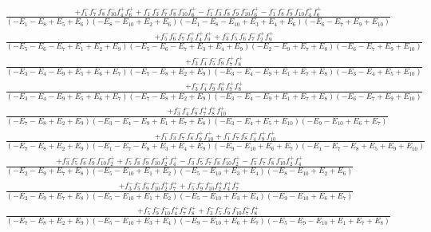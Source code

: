 \documentclass{article}
\begin{document}
\[\begin{array}{rcl}
\frac{+f_{1}^{-}f_{7}^{-}f_{8}^{-}f_{10}^{-}f_{4}^{+}f_{6}^{+}+f_{1}^{-}f_{3}^{-}f_{7}^{-}f_{8}^{-}f_{10}^{-}f_{6}^{+}-f_{1}^{-}f_{3}^{-}f_{8}^{-}f_{9}^{-}f_{10}^{-}f_{6}^{+}-f_{1}^{-}f_{8}^{-}f_{9}^{-}f_{10}^{-}f_{4}^{+}f_{6}^{+}}{(-E_{1}-E_{8}+E_{5}+E_{6})(-E_{8}-E_{10}+E_{2}+E_{6})(-E_{1}-E_{8}-E_{10}+E_{3}+E_{4}+E_{6})(-E_{6}-E_{7}+E_{9}+E_{10})}\\
\frac{+f_{5}^{-}f_{6}^{-}f_{7}^{-}f_{2}^{+}f_{4}^{+}f_{9}^{+}+f_{3}^{-}f_{5}^{-}f_{6}^{-}f_{7}^{-}f_{2}^{+}f_{9}^{+}}{(-E_{5}-E_{6}-E_{7}+E_{1}+E_{2}+E_{9})(-E_{5}-E_{6}-E_{7}+E_{3}+E_{4}+E_{9})(-E_{2}-E_{9}+E_{7}+E_{8})(-E_{6}-E_{7}+E_{9}+E_{10})}\\
\frac{+f_{3}^{-}f_{4}^{-}f_{5}^{-}f_{9}^{-}f_{7}^{+}f_{8}^{+}}{(-E_{3}-E_{4}-E_{9}+E_{5}+E_{6}+E_{7})(-E_{7}-E_{8}+E_{2}+E_{9})(-E_{3}-E_{4}-E_{9}+E_{1}+E_{7}+E_{8})(-E_{3}-E_{4}+E_{5}+E_{10})}\\
\frac{+f_{3}^{-}f_{4}^{-}f_{9}^{-}f_{6}^{+}f_{7}^{+}f_{8}^{+}}{(-E_{3}-E_{4}-E_{9}+E_{5}+E_{6}+E_{7})(-E_{7}-E_{8}+E_{2}+E_{9})(-E_{3}-E_{4}-E_{9}+E_{1}+E_{7}+E_{8})(-E_{6}-E_{7}+E_{9}+E_{10})}\\
\frac{+f_{3}^{-}f_{4}^{-}f_{9}^{-}f_{7}^{+}f_{8}^{+}f_{10}^{+}}{(-E_{7}-E_{8}+E_{2}+E_{9})(-E_{3}-E_{4}-E_{9}+E_{1}+E_{7}+E_{8})(-E_{3}-E_{4}+E_{5}+E_{10})(-E_{9}-E_{10}+E_{6}+E_{7})}\\
\frac{+f_{1}^{-}f_{3}^{-}f_{7}^{-}f_{8}^{-}f_{9}^{+}f_{10}^{+}+f_{1}^{-}f_{7}^{-}f_{8}^{-}f_{4}^{+}f_{9}^{+}f_{10}^{+}}{(-E_{7}-E_{8}+E_{2}+E_{9})(-E_{1}-E_{7}-E_{8}+E_{3}+E_{4}+E_{9})(-E_{9}-E_{10}+E_{6}+E_{7})(-E_{1}-E_{7}-E_{8}+E_{5}+E_{9}+E_{10})}\\
\frac{+f_{3}^{-}f_{5}^{-}f_{8}^{-}f_{9}^{-}f_{10}^{-}f_{2}^{+}+f_{5}^{-}f_{8}^{-}f_{9}^{-}f_{10}^{-}f_{2}^{+}f_{4}^{+}-f_{3}^{-}f_{5}^{-}f_{7}^{-}f_{8}^{-}f_{10}^{-}f_{2}^{+}-f_{5}^{-}f_{7}^{-}f_{8}^{-}f_{10}^{-}f_{2}^{+}f_{4}^{+}}{(-E_{2}-E_{9}+E_{7}+E_{8})(-E_{5}-E_{10}+E_{1}+E_{2})(-E_{5}-E_{10}+E_{3}+E_{4})(-E_{8}-E_{10}+E_{2}+E_{6})}\\
\frac{+f_{3}^{-}f_{5}^{-}f_{9}^{-}f_{10}^{-}f_{2}^{+}f_{7}^{+}+f_{5}^{-}f_{9}^{-}f_{10}^{-}f_{2}^{+}f_{4}^{+}f_{7}^{+}}{(-E_{2}-E_{9}+E_{7}+E_{8})(-E_{5}-E_{10}+E_{1}+E_{2})(-E_{5}-E_{10}+E_{3}+E_{4})(-E_{9}-E_{10}+E_{6}+E_{7})}\\
\frac{+f_{5}^{-}f_{9}^{-}f_{10}^{-}f_{4}^{+}f_{7}^{+}f_{8}^{+}+f_{3}^{-}f_{5}^{-}f_{9}^{-}f_{10}^{-}f_{7}^{+}f_{8}^{+}}{(-E_{7}-E_{8}+E_{2}+E_{9})(-E_{5}-E_{10}+E_{3}+E_{4})(-E_{9}-E_{10}+E_{6}+E_{7})(-E_{5}-E_{9}-E_{10}+E_{1}+E_{7}+E_{8})}\\

\end{array}\]
\end{document}
